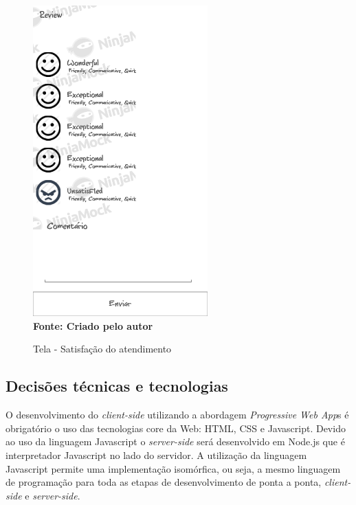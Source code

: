 \begin{figure}[ht]
	\centering	
	\caption[\hspace{0.1cm}]{Tela - Satisfação do atendimento}
	\vspace{-0.4cm}
	\includegraphics[width=0.6\textwidth]{figuras/c_finish.png}
	 \vspace{-0.2cm}
	\\\textbf{\footnotesize Fonte: Criado pelo autor }
	\label{fig:w10}
\end{figure}
\vspace{-0.5cm}

\subsection{\esp Decisões técnicas e tecnologias}

O desenvolvimento do \textit{client-side} utilizando a abordagem \textit{Progressive Web App}s é obrigatório o uso das tecnologias core da Web: HTML, CSS e Javascript. Devido ao uso da linguagem Javascript o \textit{server-side} será desenvolvido em Node.js que é interpretador Javascript no lado do servidor. A utilização da linguagem Javascript permite uma implementação isomórfica, ou seja, a mesmo linguagem de programação para toda as etapas de desenvolvimento de ponta a ponta, \textit{client-side} e \textit{server-side}.

